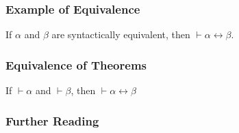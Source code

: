 \documentclass{beamer}
\theoremstyle{indentDefn} \newtheorem{defn}[]{Definition}
\begin{document}


\begin{frame}
	\frametitle{Example of Equivalence}	
	
	If $\alpha$ and $\beta$ are syntactically equivalent, then $\vdash \alpha \leftrightarrow \beta$. 
	
	\vspace{7cm}
	
\end{frame}

\begin{frame}
	\frametitle{Equivalence of Theorems}
	
	If $\vdash \alpha$ and $\vdash \beta$, then $\vdash \alpha \leftrightarrow \beta$
	
	\vspace{7cm}
	
\end{frame}

\begin{frame}
	\frametitle{Further Reading}
	
    \printbibliography  
	
\end{frame}
\end{document}
